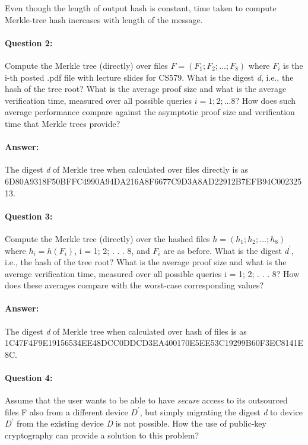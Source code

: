 \documentclass{article}
\begin{document}
        Even though the length of output hash is constant, time taken to compute Merkle-tree hash increases with length of the message.
        
    \paragraph{Question 2:} Compute the Merkle tree (directly) over files $F = (F_1; F_2; . . . ; F_8)$ where $F_i$ is the i-th posted .pdf file with lecture slides for CS579. What is the digest \emph{d}, i.e., the hash of the tree root? What is the average proof size and what is the average verification time, measured over all possible queries $i = 1; 2; . . . 8$? How does such average performance compare against the asymptotic proof size and verification time that Merkle trees provide?    
    \paragraph{Answer:\newline}
        The digest \emph{d} of Merkle tree when calculated over files directly is as \newline 6D80A9318F50BFFC4990A94DA216A8F6677C9D3A8AD22912B7EFB94C00232513.
        
    \paragraph{Question 3:} Compute the Merkle tree (directly) over the hashed files $h = (h_1; h_2; . . . ; h_8)$ where $h_i = h(F_i)$, i = 1; 2; . . . 8, and $F_i$ are as before. What is the digest $d^\prime$, i.e., the hash of the tree root? What is the average proof size and what is the average verification time, measured over all possible queries i = 1; 2; . . . 8? How does these averages compare with the worst-case corresponding values?
    \paragraph{Answer:\newline}
        The digest \emph{d} of Merkle tree when calculated over hash of files is as \newline 1C47F4F9E19156534EE48DCC0DDCD3EA400170E5EE53C19299B60F3EC8141E8C. 
    
    
    \paragraph{Question 4:} Assume that the user wants to be able to have \emph{secure} access to its outsourced files F also from a different device $D^\prime$, but simply migrating the digest \emph{d} to device $D^\prime$ from the existing device \emph{D} is not possible. How the use of public-key cryptography can provide a solution to this problem?
\end{document}
